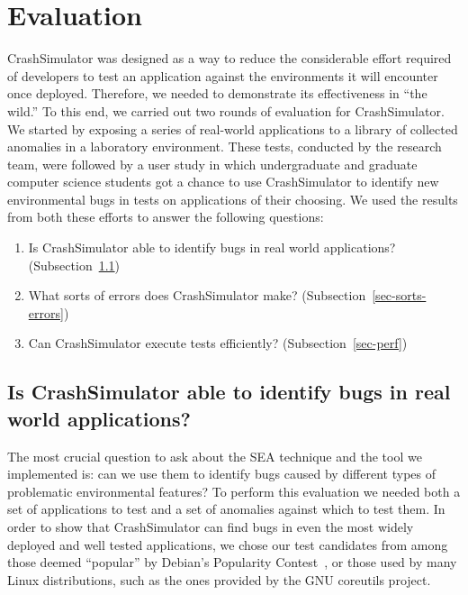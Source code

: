 \section{Evaluation}
\label{SEC:evaluation}

CrashSimulator was designed
as a way to reduce the considerable effort
required of developers to test an application
against the environments it will encounter once deployed.
Therefore,
we needed to demonstrate its effectiveness in ``the wild.''
To this end,
we carried out two rounds of
evaluation for CrashSimulator.
We started by exposing
a series of real-world applications
to a library of collected anomalies in a laboratory environment.
These tests,
conducted by the research team,
were followed by a user study
in which undergraduate and graduate computer science students
got a chance to use CrashSimulator
to identify new environmental bugs
in tests on applications of their choosing.
We used the results from both these efforts
to answer the following questions:

\begin{enumerate}

\item{Is CrashSimulator able to identify bugs in real world applications?
    (Subsection~\ref{sec-env-bugs})}

\item{What sorts of errors does CrashSimulator make?
    (Subsection~\ref{sec-sorts-errors})}

\item{Can CrashSimulator
      execute tests efficiently? (Subsection~\ref{sec-perf})}

\end{enumerate}

\subsection{Is CrashSimulator able to identify bugs in real world
applications?}
\label{sec-env-bugs}

The most crucial question to ask about the SEA technique and the tool we
implemented is:
can we use them to identify bugs
caused by different types of problematic environmental features?
To perform this evaluation we needed both a set of applications to test
and a set of anomalies against which to test them.
In order to show that CrashSimulator
can find bugs in even the most widely deployed
and well tested applications,
we chose our test candidates
from among those deemed ``popular''
by Debian's Popularity Contest~\cite{DebPopCon},
or those used
by many Linux distributions,
such as the ones provided
by the GNU coreutils project.

